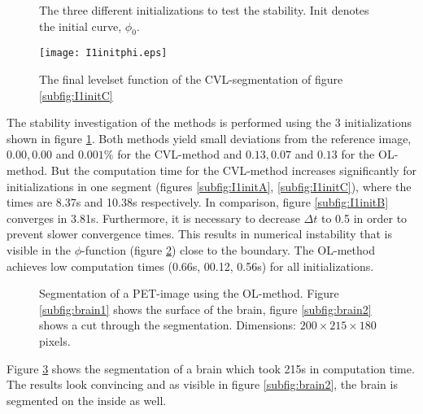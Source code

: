 \begin{figure}[h]
  \centering
  \caption{The three different initializations to test the stability. Init denotes the initial curve, $\phi_0$.}\label{I1init}
\end{figure}

\begin{figure}[h]
  \centering
  \texttt{[image: I1initphi.eps]}
  \caption{The final levelset function of the CVL-segmentation of figure \ref{subfig:I1initC}}\label{I1initphi}
\end{figure}


The stability investigation of the methods is performed using the 3 initializations shown in figure \ref{I1init}. Both methods yield small deviations from the reference image, $0.00, 0.00$ and $0.001\%$ for the CVL-method and $0.13, 0.07$ and $0.13$ for the OL-method. But the computation time for the CVL-method increases significantly for initializations in one segment (figures \ref{subfig:I1initA}, \ref{subfig:I1initC}), where the times are 8.37s and 10.38s respectively. In comparison, figure \ref{subfig:I1initB} converges in 3.81s. Furthermore, it is necessary to decrease $\Delta t$ to 0.5 in order to prevent slower convergence times. This results in numerical instability that is visible in the $\phi$-function (figure \ref{I1initphi}) close to the boundary. The OL-method achieves low computation times (0.66s, 00.12, 0.56s) for all initializations.

\begin{figure}[h]
  \centering
  \caption{Segmentation of a PET-image using the OL-method. Figure \ref{subfig:brain1} shows the surface of the brain, figure \ref{subfig:brain2} shows a cut through the segmentation. Dimensions: $200\times 215\times 180$ pixels.}\label{fig:brain}
\end{figure}

Figure \ref{fig:brain} shows the segmentation of a brain which took 215s in computation time. The results look convincing and as visible in figure \ref{subfig:brain2}, the brain is segmented on the inside as well.

